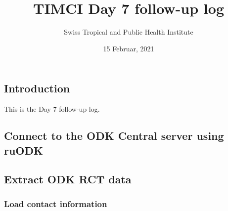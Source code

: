 \documentclass[
]{article}
\title{TIMCI Day 7 follow-up log}
\author{Swiss Tropical and Public Health Institute}
\date{15 Februar, 2021}
\begin{document}
\maketitle

\hypertarget{introduction}{%
\subsection{Introduction}\label{introduction}}

This is the Day 7 follow-up log.

\hypertarget{connect-to-the-odk-central-server-using-ruodk}{%
\subsection{Connect to the ODK Central server using
ruODK}\label{connect-to-the-odk-central-server-using-ruodk}}

\hypertarget{extract-odk-rct-data}{%
\subsection{Extract ODK RCT data}\label{extract-odk-rct-data}}

\hypertarget{load-contact-information}{%
\subsubsection{Load contact
information}\label{load-contact-information}}
\end{document}
